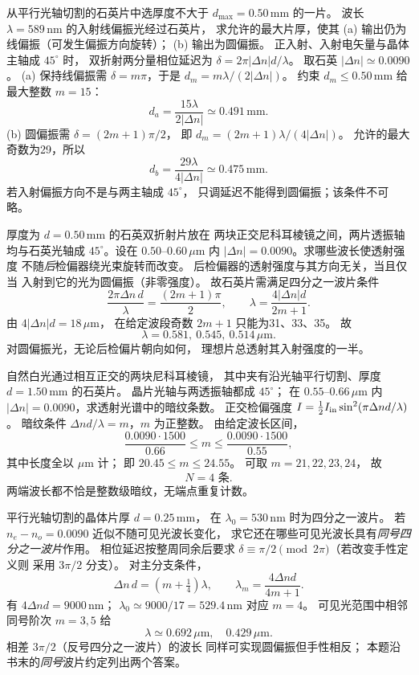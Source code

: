 从平行光轴切割的石英片中选厚度不大于
$d_{\max}=0.50\,\mathrm{mm}$ 的一片。
波长 $\lambda=589\,\mathrm{nm}$ 的入射线偏振光经过石英片，
求允许的最大片厚，使其
(a) 输出仍为线偏振（可发生偏振方向旋转）；
(b) 输出为圆偏振。
\exsolution
正入射、入射电矢量与晶体主轴成 $45^\circ$ 时，
双折射两分量相位延迟为
$\delta=2\pi|\Delta n|d/\lambda$。
取石英 $|\Delta n|\simeq0.0090$。
(a) 保持线偏振需 $\delta=m\pi$，于是
$d_m=m\lambda/(2|\Delta n|)$。
约束 $d_m\le0.50\,\mathrm{mm}$ 给最大整数 $m=15$：
\[
 \boxed{d_a=\frac{15\lambda}{2|\Delta n|}
 \simeq0.491\,\mathrm{mm}}.
\]
(b) 圆偏振需 $\delta=(2m+1)\pi/2$，
即 $d_m=(2m+1)\lambda/(4|\Delta n|)$。
允许的最大奇数为29，所以
\[
 \boxed{d_b=\frac{29\lambda}{4|\Delta n|}
 \simeq0.475\,\mathrm{mm}}.
\]
\excheck 若入射偏振方向不是与两主轴成 $45^\circ$，
只调延迟不能得到圆偏振；该条件不可略。

厚度为 $d=0.50\,\mathrm{mm}$ 的石英双折射片放在
两块正交尼科耳棱镜之间，两片透振轴均与石英光轴成
$45^\circ$。设在 $0.50$--$0.60\,\mu\mathrm m$ 内
$|\Delta n|=0.0090$。求哪些波长使透射强度
不随\emph{后}检偏器绕光束旋转而改变。
\exsolution
后检偏器的透射强度与其方向无关，当且仅当
入射到它的光为圆偏振（非零强度）。
故石英片需满足四分之一波片条件
\[
 \frac{2\pi\Delta n\,d}{\lambda}
 =\frac{(2m+1)\pi}{2},\qquad
 \boxed{\lambda=\frac{4|\Delta n|d}{2m+1}}.
\]
由 $4|\Delta n|d=18\,\mu\mathrm m$，
在给定波段奇数 $2m+1$ 只能为31、33、35。
故
\[
 \boxed{\lambda=0.581,\ 0.545,\ 0.514\,\mu\mathrm m}.
\]
\excheck 对圆偏振光，无论后检偏片朝向如何，
理想片总透射其入射强度的一半。

自然白光通过相互正交的两块尼科耳棱镜，
其中夹有沿光轴平行切割、厚度
$d=1.50\,\mathrm{mm}$ 的石英片。
晶片光轴与两透振轴都成 $45^\circ$；
在 $0.55$--$0.66\,\mu\mathrm m$ 内
$|\Delta n|=0.0090$，求透射光谱中的暗纹条数。
\exsolution
正交检偏强度
$I=\tfrac12 I_{\rm in}\sin^2(\pi\Delta n d/\lambda)$。
暗纹条件 $\Delta n d/\lambda=m$，$m$ 为正整数。
由给定波长区间，
\[
 \frac{0.0090\cdot1500}{0.66}
 \le m\le
 \frac{0.0090\cdot1500}{0.55},
\]
其中长度全以 $\mu\mathrm m$ 计；
即 $20.45\le m\le24.55$。
可取 $m=21,22,23,24$，
故
\[
 \boxed{N=4\text{ 条}}.
\]
\excheck 两端波长都不恰是整数级暗纹，无端点重复计数。

平行光轴切割的晶体片厚 $d=0.25\,\mathrm{mm}$，
在 $\lambda_0=530\,\mathrm{nm}$ 时为四分之一波片。
若 $n_e-n_o=0.0090$ 近似不随可见光波长变化，
求它还在哪些可见光波长具有\emph{同号四分之一波片}作用。
\exsolution
相位延迟按整周同余后要求
$\delta\equiv\pi/2\pmod{2\pi}$（若改变手性定义则
采用 $3\pi/2$ 分支）。
对主分支条件，
\[
 \Delta n\,d=(m+\tfrac14)\lambda,\qquad
 \boxed{\lambda_m=\frac{4\Delta n d}{4m+1}}.
\]
有 $4\Delta n d=9000\,\mathrm{nm}$；
$\lambda_0\simeq9000/17=529.4\,\mathrm{nm}$ 对应 $m=4$。
可见光范围中相邻同号阶次 $m=3,5$ 给
\[
 \boxed{\lambda\simeq0.692\,\mu\mathrm m,\quad
 0.429\,\mu\mathrm m}.
\]
\excheck 相差 $3\pi/2$（反号四分之一波片）的波长
同样可实现圆偏振但手性相反；
本题沿书末的\emph{同号}波片约定列出两个答案。

